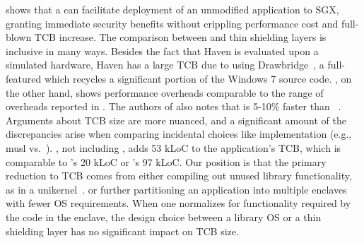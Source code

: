\graphenesgx{} shows that 
a \libos{} can facilitate deployment of an unmodified application to SGX,
granting immediate security benefits
without crippling performance cost and full-blown TCB increase.
The comparison between \liboses{} and thin shielding layers is inclusive in many ways.
Besides the fact that
Haven is evaluated upon a simulated hardware,
Haven has a large TCB due to using Drawbridge~\cite{porter11drawbridge},
a full-featured \libos{}
which recycles a significant portion of the Windows 7 source code.
\graphenesgx{}, on the other hand,
shows performance overheads comparable to the range of overheads reported in \scone{}.
The authors of \panoply{} also notes that \graphenesgx{}
is 5-10\% faster than \panoply{}~\cite{shinde17panoply}.
Arguments about TCB size are more nuanced, and a significant amount of the discrepancies
arise when comparing incidental choices like \libc{} implementation (e.g., musl vs.\ \glibc{}).
\graphene{}, not including \glibc{}, adds 53 kLoC to the application's TCB, which is comparable to
\panoply{}'s 20 kLoC or \scone{}'s 97 kLoC. %
Our position is that the primary reduction to TCB comes from either compiling out
unused library functionality, as in a unikernel~\cite{unikernels}.%
or further partitioning an application into multiple enclaves with fewer
OS requirements.
When one normalizes for functionality required by the code in the enclave, the design choice between a library OS or a thin shielding layer has no significant impact on TCB size.



